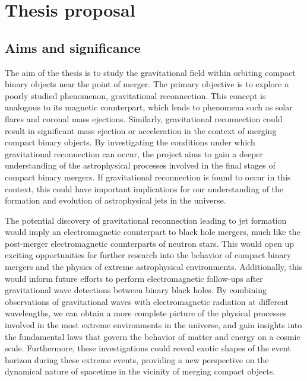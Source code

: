

% 

\chapter{Thesis proposal}
\section{Aims and significance}

The aim of the thesis is to study the gravitational field within orbiting compact binary objects near the point of merger. The primary objective is to explore a poorly studied  phenomenon, gravitational reconnection. This concept is analogous to its magnetic counterpart, which leads to phenomena such as solar flares and coronal mass ejections. Similarly, gravitational reconnection could result in significant mass ejection or acceleration in the context of merging compact binary objects. By investigating the conditions under which gravitational reconnection can occur, the project aims to gain a deeper understanding of the astrophysical processes involved in the final stages of compact binary mergers. If gravitational reconnection is found to occur in this context, this could have important implications for our understanding of the formation and evolution of astrophysical jets in the universe.

The potential discovery of gravitational reconnection leading to jet formation would imply an electromagnetic counterpart to black hole mergers, much like the post-merger electromagnetic counterparts of neutron stars. This would open up exciting opportunities for further research into the behavior of compact binary mergers and the physics of extreme astrophysical environments. Additionally, this would inform future efforts to perform electromagnetic follow-ups after gravitational wave detections between binary black holes. By combining observations of gravitational waves with electromagnetic radiation at different wavelengths, we can obtain a more complete picture of the physical processes involved in the most extreme environments in the universe, and gain insights into the fundamental laws that govern the behavior of matter and energy on a cosmic scale. Furthermore, these investigations could reveal exotic shapes of the event horizon during these extreme events, providing a new perspective on the dynamical nature of spacetime in the vicinity of merging compact objects.

